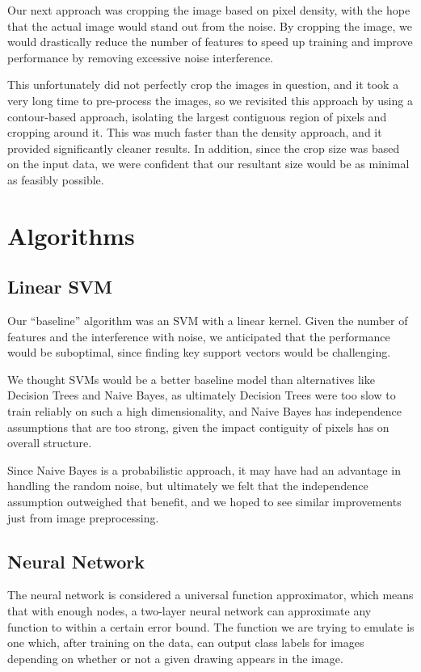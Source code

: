 \documentclass[conference]{IEEEtran}
\begin{document}
Our next approach was cropping the image based on pixel density, with the hope that the actual image would stand out from the noise. By cropping the image, we would drastically reduce the number of features to speed up training and improve performance by removing excessive noise interference.

This unfortunately did not perfectly crop the images in question, and it took a very long time to pre-process the images, so we revisited this approach by using a contour-based approach, isolating the largest contiguous region of pixels and cropping around it. This was much faster than the density approach, and it provided significantly cleaner results. In addition, since the crop size was based on the input data, we were confident that our resultant size would be as minimal as feasibly possible.

\section{\textbf{Algorithms}}

\subsection{Linear SVM}

Our ``baseline'' algorithm was an SVM with a linear kernel. Given the number of features and the interference with noise, we anticipated that the performance would be suboptimal, since finding key support vectors would be challenging.

We thought SVMs would be a better baseline model than alternatives like Decision Trees and Naive Bayes, as ultimately Decision Trees were too slow to train reliably on such a high dimensionality, and Naive Bayes has independence assumptions that are too strong, given the impact contiguity of pixels has on overall structure. 

Since Naive Bayes is a probabilistic approach, it may have had an advantage in handling the random noise, but ultimately we felt that the independence assumption outweighed that benefit, and we hoped to see similar improvements just from image preprocessing.

\subsection{Neural Network}

The neural network is considered a universal function approximator, which means that with enough nodes, a two-layer neural network can approximate any function to within a certain error bound. The function we are trying to emulate is one which, after training on the data, can output class labels for images depending on whether or not a given drawing appears in the image.
\end{document}
